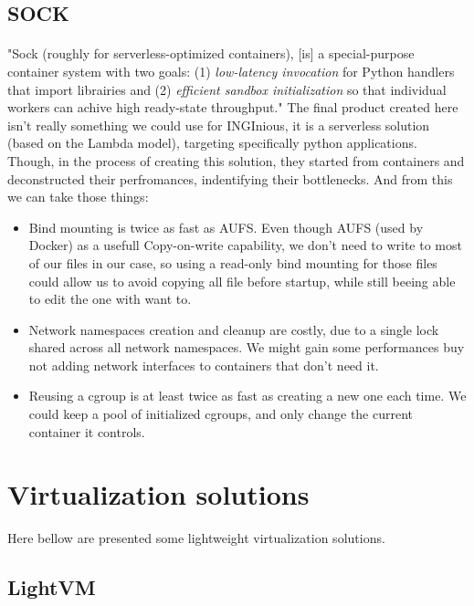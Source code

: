 \subsection{SOCK} \label{subsec-sock}
\paragraph{}"Sock (roughly for serverless-optimized containers), [is] a special-purpose container system with two goals: (1) \textit{low-latency invocation} for Python handlers that import librairies and (2) \textit{efficient sandbox initialization} so that individual workers can achive high ready-state throughput." \cite{oakes2018sock}  The final product created here isn't really something we could use for INGInious, it is a serverless solution (based on the Lambda model), targeting specifically python applications.  Though, in the process of creating this solution, they started from containers and deconstructed their perfromances, indentifying their bottlenecks.  And from this we can take those things:
\begin{itemize}
\renewcommand\labelitemi{--}
  \item Bind mounting is twice as fast as AUFS.  Even though AUFS (used by Docker) as a usefull Copy-on-write capability, we don't need to write to most of our files in our case, so using a read-only bind mounting for those files could allow us to avoid copying all file before startup, while still beeing able to edit the one with want to.
  \item Network namespaces creation and cleanup are costly, due to a single lock shared across all network namespaces.  We might gain some performances buy not adding network interfaces to containers that don't need it.
  \item Reusing a cgroup is at least twice as fast as creating a new one each time.  We could keep a pool of initialized cgroups, and only change the current container it controls.
\end{itemize}

\section{Virtualization solutions}

Here bellow are presented some lightweight virtualization solutions.

\subsection{LightVM} 
